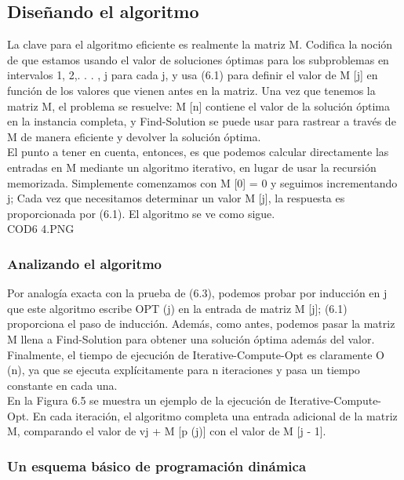 \documentclass[a4paper, 12pt]{book}
\theoremstyle{dotless}
\begin{document}
\subsection{Diseñando el algoritmo}

La clave para el algoritmo eficiente es realmente la matriz M. Codifica la noción de que estamos usando el valor de soluciones óptimas para los subproblemas en intervalos {1, 2,. . . , j} para cada j, y usa (6.1) para definir el valor de M [j] en función de los valores que vienen antes en la matriz. Una vez que tenemos la matriz M, el problema se resuelve: M [n] contiene el valor de la solución óptima en la instancia completa, y Find-Solution se puede usar para rastrear a través de M de manera eficiente y devolver la solución óptima.\\

El punto a tener en cuenta, entonces, es que podemos calcular directamente las entradas en M mediante un algoritmo iterativo, en lugar de usar la recursión memorizada. Simplemente comenzamos con M [0] = 0 y seguimos incrementando j; Cada vez que necesitamos determinar un valor M [j], la respuesta es proporcionada por (6.1). El algoritmo se ve como sigue.\\

COD6 4.PNG

\subsubsection*{Analizando el algoritmo}

Por analogía exacta con la prueba de (6.3), podemos probar por inducción en j que este algoritmo escribe OPT (j) en la entrada de matriz M [j]; (6.1) proporciona el paso de inducción. Además, como antes, podemos pasar la matriz M llena a Find-Solution para obtener una solución óptima además del valor. Finalmente, el tiempo de ejecución de Iterative-Compute-Opt es claramente O (n), ya que se ejecuta explícitamente para n iteraciones y pasa un tiempo constante en cada una.\\

En la Figura 6.5 se muestra un ejemplo de la ejecución de Iterative-Compute-Opt. En cada iteración, el algoritmo completa una entrada adicional de la matriz M, comparando el valor de vj + M [p (j)] con el valor de M [j - 1].\\

\subsubsection*{Un esquema básico de programación dinámica}
\end{document}
